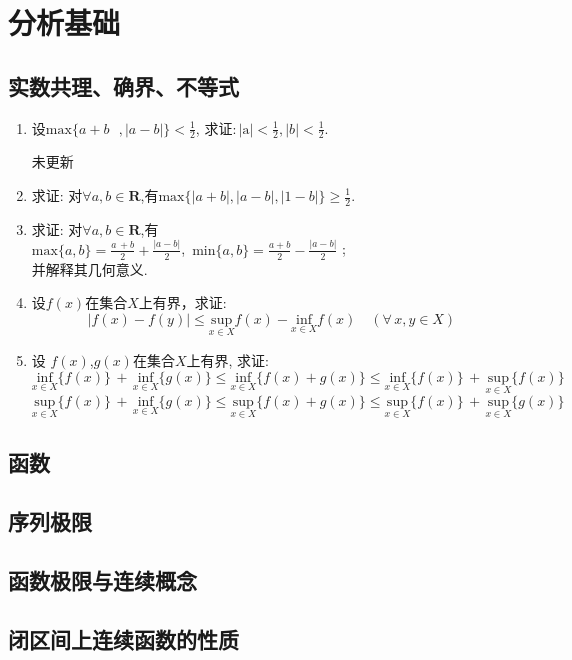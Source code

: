 \chapter{分析基础}
\section{实数共理、确界、不等式}
\begin{enumerate}
	\item 设$\mathrm{max}\{a+b\text{ },|a-b|\}<\tfrac{1}{2}$, 求证:\,$|\mathrm{a}|<\tfrac{1}{2},  |b|<\tfrac{1}{2}.$
	\begin{solution}
		未更新
	\end{solution}
	\item 求证: 对$\mathbf{\forall}a,b\in \boldsymbol{R}$,有$\mathrm{max}\{ |a+b| ,|a-b| , |1-b| \} \ge \tfrac{1}{2}$.
	\begin{solution}
		
	\end{solution}
	\item 求证: 对$\forall a,b\in \boldsymbol{R}$,有\\
	$\mathrm{max} \{a,b\} = \tfrac{a\,+b}{2}+\tfrac{|a - b|}{2}$,\ $\mathrm{min} \{a,b\} = \tfrac{a+b}{2}-\tfrac{|a-b|}{2}$ ;\\
	并解释其几何意义.
	\begin{solution}
	
	\end{solution}
	\item 设$f\left( x \right) $在集合$X$上有界，求证:
	$$
	|f\left( x \right)-f\left( y\right)  | \le \underset{x\in X}{\mathrm{sup}}f\left( x\right)  -\underset{x\in X}{\mathrm{inf}}f\left( x \right)\quad (\forall\,x, y \in X)
	$$ 
	\begin{solution}
		
	\end{solution}
	\item 设 $f(x)$,$g(x)$在集合$X$上有界, 求证:\\
	$$
	\underset{x\in X}{\mathrm{inf}}\{f(x)\}\,+\,\underset{x\in X}{\mathrm{inf}}\{g(x)\} \le
	\underset{x\in X}{\mathrm{inf}}\{f(x)+g(x)\} \le 	\underset{x\in X}{\mathrm{inf}}\{f(x)\}\,+\,\underset{x\in X}{\mathrm{sup}}\{f(x)\}
	$$
	$$
		\underset{x\in X}{\mathrm{sup}}\{f(x)\}\,+\,\underset{x\in X}{\mathrm{inf}}\{g(x)\} \le 	\underset{x\in X}{\mathrm{sup}}\{f(x)+g(x)\} \le \underset{x\in X}{\mathrm{sup}}\{f(x)\}\,+\,	\underset{x\in X}{\mathrm{sup}}\{g(x)\}
	$$
	\begin{solution}
		
	\end{solution}
\end{enumerate}
\section{函数}
\section{序列极限}
\section{函数极限与连续概念}
\section{闭区间上连续函数的性质}